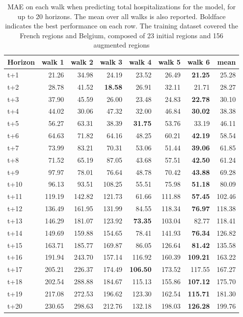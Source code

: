 \begin{table}[H]
\centering
\caption{MAE on each walk when predicting total hospitalizations for the model, for up to 20 horizons. The mean over all walks is also reported. Boldface indicates the best performance on each row. The training dataset covered the French regions and Belgium, composed of 23 initial regions and 156 augmented regions }
\label{tab:MAE_walk_dense_model}
\begin{tabular}{lrrrrrrr}
\toprule
Horizon &  walk 1 &  walk 2 &  walk 3 &  walk 4 &  walk 5 &  walk 6 &   mean \\
\midrule
t+1  & 21.26  & 34.98  & 24.19  & 23.52  & 26.49  & \textbf{21.25}  & 25.28  \\
t+2  & 28.78  & 41.52  & \textbf{18.58}  & 26.91  & 32.11  & 21.71  & 28.27  \\
t+3  & 37.90  & 45.59  & 26.00  & 23.48  & 24.83  & \textbf{22.78}  & 30.10  \\
t+4  & 44.02  & 30.06  & 47.32  & 32.00  & 46.84  & \textbf{30.02}  & 38.38  \\
t+5  & 56.27  & 63.31  & 38.39  & \textbf{31.75}  & 53.76  & 33.19  & 46.11  \\
t+6  & 64.63  & 71.82  & 64.16  & 48.25  & 60.21  & \textbf{42.19}  & 58.54  \\
t+7  & 73.99  & 83.21  & 70.31  & 53.06  & 51.44  & \textbf{39.06}  & 61.85  \\
t+8  & 71.52  & 65.19  & 87.05  & 43.68  & 57.51  & \textbf{42.50}  & 61.24  \\
t+9  & 97.97  & 78.01  & 76.64  & 48.78  & 70.42  & \textbf{43.88}  & 69.28  \\
t+10  & 96.13  & 93.51  & 108.25  & 55.51  & 75.98  & \textbf{51.18}  & 80.09  \\
t+11  & 119.19  & 142.82  & 121.73  & 61.66  & 111.88  & \textbf{57.45}  & 102.46  \\
t+12  & 136.49  & 161.95  & 131.99  & 84.55  & 118.34  & \textbf{76.97}  & 118.38  \\
t+13  & 146.29  & 181.07  & 123.92  & \textbf{73.35}  & 103.04  & 82.77  & 118.41  \\
t+14  & 149.69  & 159.88  & 154.65  & 78.41  & 141.93  & \textbf{76.34}  & 126.82  \\
t+15  & 163.71  & 185.77  & 169.87  & 86.05  & 126.64  & \textbf{81.42}  & 135.58  \\
t+16  & 191.94  & 243.70  & 157.14  & 116.92  & 160.39  & \textbf{109.21}  & 163.22  \\
t+17  & 205.21  & 226.37  & 174.49  & \textbf{106.50}  & 173.52  & 117.55  & 167.27  \\
t+18  & 202.54  & 288.88  & 184.67  & 115.13  & 155.86  & \textbf{107.12}  & 175.70  \\
t+19  & 217.08  & 272.53  & 196.62  & 123.30  & 162.54  & \textbf{115.71}  & 181.30  \\
t+20  & 230.65  & 298.63  & 212.76  & 132.18  & 198.03  & \textbf{126.28}  & 199.76  \\

\bottomrule
\end{tabular}
\end{table}
